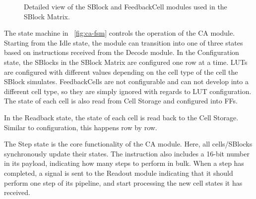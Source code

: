 \begin{figure}[ht]
  \qquad
  \caption{
    Detailed view of the SBlock and FeedbackCell modules used in the
    SBlock Matrix.\label{fig:ca-celltypes}
  }
\end{figure}

The state machine in \figurename~\ref{fig:ca-fsm} controls the operation of the
CA module. Starting from the Idle state, the module can transition into one of
three states based on instructions received from the Decode module. In the
Configuration state, the SBlocks in the SBlock Matrix are configured one row at
a time. LUTs are configured with different values depending on the cell type of
the cell the SBlock simulates. FeedbackCells are not configurable and can not
develop into a different cell type, so they are simply ignored with regards to
LUT configuration. The state of each cell is also read from Cell Storage and
configured into FFs.

In the Readback state, the state of each cell is read back to the Cell Storage.
Similar to configuration, this happens row by row.

The Step state is the core functionality of the CA module. Here, all
cells/SBlocks synchronously update their states. The instruction also includes a
16-bit number in its payload, indicating how many steps to perform in bulk. When
a step has completed, a signal is sent to the Readout module indicating that it
should perform one step of its pipeline, and start processing the new cell
states it has received.

